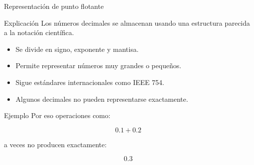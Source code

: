\documentclass[10pt, aspectratio=169]{beamer}
\begin{document}
	\begin{frame}{Representación de punto flotante}
		
		\small
		
		\begin{block}{Explicación}
			Los números decimales se almacenan usando una estructura parecida a la notación científica.
		\end{block}
		
		\begin{itemize}
			\item Se divide en signo, exponente y mantisa.
			\item Permite representar números muy grandes o pequeños.
			\item Sigue estándares internacionales como IEEE 754.
			\item Algunos decimales no pueden representarse exactamente.
		\end{itemize}
		
		\vspace{0.3cm}
		
		\begin{block}{Ejemplo}
			Por eso operaciones como:
			
			\[
			0.1 + 0.2
			\]
			
			a veces no producen exactamente:
			
			\[
			0.3
			\]
		\end{block}
		
	\end{frame}
	
\end{document}
